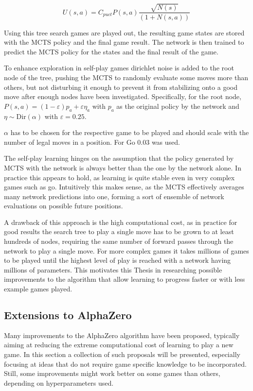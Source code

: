 \documentclass[12pt,onecolumn,oneside,titlepage]{article}
\begin{document}
\begin{equation}
 U(s,a) = C_{puct} P(s,a) \frac{\sqrt{N(s)}}{(1+N(s,a))}\label{eq:alpha_zero_u}
\end{equation}

Using this tree search games are played out, the resulting game states are stored with the MCTS policy and the final game result. The network is then trained to predict the MCTS policy for the states and the final result of the game.

To enhance exploration in self-play games dirichlet noise is added to the root node of the tree, pushing the MCTS to randomly evaluate some moves more than others, but not disturbing it enough to prevent it from stabilizing onto a good move after enough nodes have been investigated.
Specifically, for the root node, $P(s, a) = (1 - \varepsilon)p_a+ \varepsilon \eta_a$ with $p_a$ as the original policy by the network and $\eta \sim \text{Dir}(\alpha)$ with $\varepsilon = 0.25$.

$\alpha$ has to be chosen for the respective game to be played
and should scale with the number of legal moves in a position. For Go $0.03$ was used.

The self-play learning hinges on the assumption that the policy generated by MCTS with the network is always better than the one by the network alone. In practice this appears to hold, as learning is quite stable even in very complex games such as go. Intuitively this makes sense,
as the MCTS effectively averages many network predictions into one, forming a sort of ensemble of network evaluations on possible future positions.

A drawback of this approach is the high computational cost, as in practice for good results the search tree to play a single move has to be grown to at least hundreds of nodes, requiring the same number of forward passes through the network to play a single move.
For more complex games it takes millions of games to be played until the highest level of play is reached with a network having millions of parameters. This motivates this Thesis in researching possible improvements to the algorithm that allow learning to progress
faster or with less example games played.

\subsection{Extensions to AlphaZero} \label{s:prev_extensions}

Many improvements to the AlphaZero algorithm have been proposed, typically aiming at reducing the extreme computational cost of learning to play a new game.
In this section a collection of such proposals will be presented, especially focusing at ideas that do not require game specific knowledge to be incorporated. Still, some improvements might work better on some games than others,
depending on hyperparameters used. 
\end{document}
